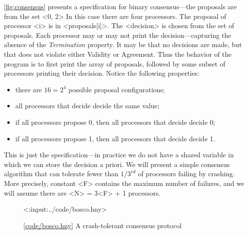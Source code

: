 \documentclass{report}
\newcommand{\harmonylink}[1]{%
[\href{https://harmony.cs.cornell.edu/#1}{\underline{#1}}]%
}
\newenvironment{code}{
\tcolorbox
}{
\endtcolorbox
}
\begin{document}
\autoref{fig:consensus} presents a specification for binary
consensus---the proposals are from the set <{{0, 2}}>
In this case there are four processors.  The proposal of processor <{i}>
is in <{proposals[i]}>.
The <{decision}> is chosen from the set of proposals.
Each processor may or may not print the decision---capturing the
absence of the \emph{Termination} property.
It may be that no decisions are made, but that does not
violate either Validity or Agreement.
Thus the behavior of the program is to first print the array of
proposals, followed by some subset of processors printing their decision.
Notice the following properties:
\begin{itemize}
\item there are $16 = 2^4$ possible proposal configurations;
\item all processors that decide decide the same value;
\item if all processors propose 0, then all processors that decide decide 0;
\item if all processors propose 1, then all processors that decide decide 1.
\end{itemize}

This is just the specification---in practice we do not have a shared
variable in which we can store the decision a priori.
We will present a simple consensus algorithm that can tolerate
fewer than $1/3^{rd}$ of processors failing by crashing.
More precisely,
constant <{F}> contains the maximum number of failures, and
we will assume there are <{N}> = 3<{F}> + 1 processors.

\begin{figure}
\begin{code}
<{:input:../code/bosco.hny}>
\end{code}
\caption{\harmonylink{code/bosco.hny} A crash-tolerant consensus protocol}
\label{fig:bosco}
\end{figure}
\end{document}
